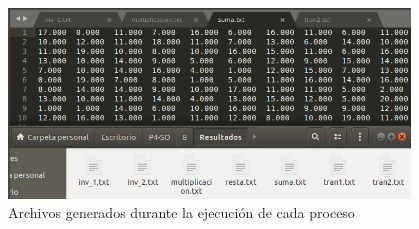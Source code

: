 \documentclass[12pt]{article}
\begin{document}
\begin{itemize}
\begin{figure}[h!]
                        
                        \includegraphics[width=0.95\textwidth]{Practica4/Images/Linux/8_10.png}
                        \caption{Archivos generados durante la ejecución de cada proceso}
                        
                    \end{figure}

           \end{itemize}

        
             
   
\end{document}
